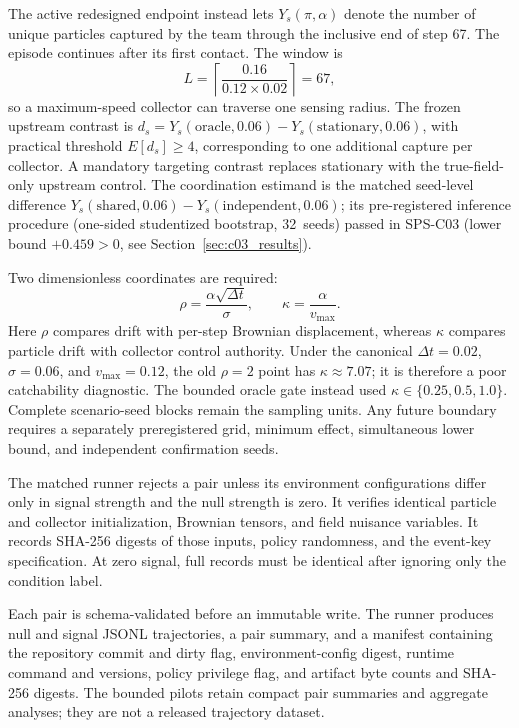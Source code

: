 \documentclass{article}
\begin{document}
The active redesigned endpoint instead lets
\(Y_s(\pi,\alpha)\) denote the number of unique particles captured by the team
through the inclusive end of step 67. The episode continues after its first
contact. The window is
\[
 L=\left\lceil\frac{0.16}{0.12\times0.02}\right\rceil=67,
\]
so a maximum-speed collector can traverse one sensing radius. The frozen
upstream contrast is
\(d_s=Y_s(\mathrm{oracle},0.06)-Y_s(\mathrm{stationary},0.06)\), with practical
threshold \(E[d_s]\geq4\), corresponding to one additional capture per
collector. A mandatory targeting contrast replaces stationary with the
true-field-only upstream control. The coordination estimand is the matched seed-level difference
\(Y_s(\mathrm{shared},0.06)-Y_s(\mathrm{independent},0.06)\); its
pre-registered inference procedure (one-sided studentized bootstrap,
32~seeds) passed in SPS-C03 (lower bound $+0.459>0$, see
Section~\ref{sec:c03_results}).

Two dimensionless coordinates are required:
\[
 \rho=\frac{\alpha\sqrt{\Delta t}}{\sigma},\qquad
 \kappa=\frac{\alpha}{v_{\max}}.
\]
Here \(\rho\) compares drift with per-step Brownian displacement, whereas
\(\kappa\) compares particle drift with collector control authority. Under the
canonical \(\Delta t=0.02\), \(\sigma=0.06\), and \(v_{\max}=0.12\), the old
\(\rho=2\) point has \(\kappa\approx7.07\); it is therefore a poor catchability
diagnostic. The bounded oracle gate instead used
\(\kappa\in\{0.25,0.5,1.0\}\). Complete scenario-seed blocks remain the
sampling units. Any future boundary requires a separately preregistered grid,
minimum effect, simultaneous lower bound, and independent confirmation seeds.

The matched runner rejects a pair unless its environment configurations differ
only in signal strength and the null strength is zero. It verifies identical
particle and collector initialization, Brownian tensors, and field nuisance
variables. It records SHA-256 digests of those inputs, policy randomness, and
the event-key specification. At zero signal, full records must be identical
after ignoring only the condition label.

Each pair is schema-validated before an immutable write. The runner produces
null and signal JSONL trajectories, a pair summary, and a manifest containing
the repository commit and dirty flag, environment-config digest, runtime
command and versions, policy privilege flag, and artifact byte counts and
SHA-256 digests. The bounded pilots retain compact pair summaries and aggregate
analyses; they are not a released trajectory dataset.
\end{document}
